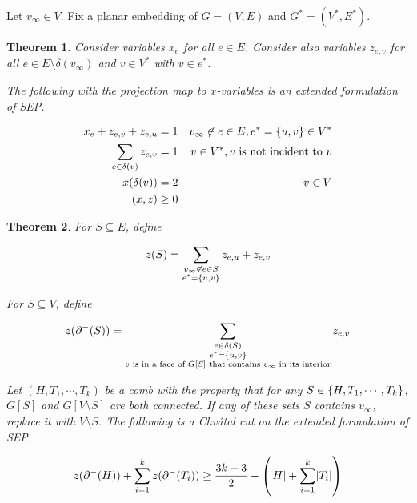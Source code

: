 \documentclass{memoir}
\newtheorem{theorem}{Theorem}
\begin{document}
Let $v_\infty \in V$.
Fix a planar embedding of $G=(V,E)$ and $G^* = (V^*, E^*)$.

\begin{theorem}
Consider variables $x_e$ for all $e\in E$. 
Consider also variables $z_{e,v}$ for all $e\in E\setminus\delta(v_\infty)$
and $v\in V^*$ with $v\in e^*$.

The following with the projection map to $x$-variables is an extended formulation of SEP.

\begin{align}
x_e + z_{e,v}+z_{e,u} &= 1 & v_\infty \not\in e \in E, e^* = \cbr{u,v} \in V^* \label{oneuse} \\
\sum_{e\in\delta(v)} z_{e,v} &= 1 & v\in V^*, \text{$v$ is not incident to $v$} \label{facedegree} \\
x(\delta(v)) &= 2 & v\in V \label{vertexdegree} \\
(x,z) &\geq 0
\end{align}
\end{theorem}


\begin{theorem}
For $S\subseteq E$, define

$$z(S) = \sum_{\substack{v_\infty\not\in e\in S \\ e^* = \cbr{u,v}}} z_{e,u} + z_{e,v}$$

For $S\subseteq V$, define 

$$z(\partial^-(S)) = \sum_{\substack{e \in \delta(S) \\ e^* = \cbr{u,v} \\ \text{$v$ is in a face of $G[S]$ that contains $v_\infty$ in its interior}}} z_{e,v}$$


Let $(H, T_1, \cdots, T_k)$ be a comb with the property that for any $S\in\cbr{H, T_1,\cdots, T_k}$, $G[S]$ and $G[V\setminus S]$ are both connected. If any of these sets $S$ contains $v_\infty$,
replace it with $V\setminus S$.
The following is a Chv\'{a}tal cut on the extended formulation of SEP.

$$z(\partial^-(H)) +  \sum_{i=1}^k z(\partial^-(T_i)) \geq \frac{3k-3}{2} - \del{\abs{H} + \sum_{i=1}^k \abs{T_i}}$$



\end{theorem}
\end{document}
